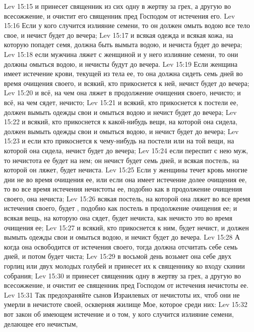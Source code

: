 \vs Lev 15:15 и принесет священник из сих  одну в жертву за грех, а другую во всесожжение, и очистит его священник пред Господом от истечения его.
\vs Lev 15:16 Если у кого случится излияние семени, то он должен омыть водою все тело свое, и нечист будет до вечера;
\vs Lev 15:17 и всякая одежда и всякая кожа, на которую попадет семя, должна быть вымыта водою, и нечиста будет до вечера;
\vs Lev 15:18 если мужчина ляжет с женщиной и  у него излияние семени, то они должны омыться водою, и нечисты будут до вечера.
\vs Lev 15:19 Если женщина имеет истечение крови, текущей из тела ее, то она должна сидеть семь дней во время очищения своего, и всякий, кто прикоснется к ней, нечист будет до вечера;
\vs Lev 15:20 и всё, на чем она ляжет в продолжение очищения своего, нечисто; и всё, на чем сядет, нечисто;
\vs Lev 15:21 и всякий, кто прикоснется к постели ее, должен вымыть одежды свои и омыться водою и нечист будет до вечера;
\vs Lev 15:22 и всякий, кто прикоснется к какой-нибудь вещи, на которой она сидела, должен вымыть одежды свои и омыться водою, и нечист будет до вечера;
\vs Lev 15:23 и если кто прикоснется к чему-нибудь на постели или на той вещи, на которой она сидела, нечист будет до вечера;
\vs Lev 15:24 если переспит с нею муж, то нечистота ее будет на нем; он нечист будет семь дней, и всякая постель, на которой он ляжет, будет нечиста.
\vs Lev 15:25 Если у женщины течет кровь многие дни не во время очищения ее, или если она имеет истечение долее  очищения ее, то во все время истечения нечистоты ее, подобно как в продолжение очищения своего, она нечиста;
\vs Lev 15:26 всякая постель, на которой она ляжет во все время истечения своего, будет , подобно как постель в продолжение очищения ее; и всякая вещь, на которую она сядет, будет нечиста, как нечисто это во время очищения ее;
\vs Lev 15:27 и всякий, кто прикоснется к ним, будет нечист, и должен вымыть одежды свои и омыться водою, и нечист будет до вечера.
\vs Lev 15:28 А когда она освободится от истечения своего, тогда должна отсчитать себе семь дней, и потом будет чиста;
\vs Lev 15:29 в восьмой день возьмет она себе двух горлиц или двух молодых голубей и принесет их к священнику ко входу скинии собрания;
\vs Lev 15:30 и принесет священник одну  в жертву за грех, а другую во всесожжение, и очистит ее священник пред Господом от истечения нечистоты ее.
\rsbpar\vs Lev 15:31 Так предохраняйте сынов Израилевых от нечистоты их, чтоб они не умерли в нечистоте своей, оскверняя жилище Мое, которое среди них:
\vs Lev 15:32 вот закон об имеющем истечение и о том, у кого случится излияние семени, делающее его нечистым,

